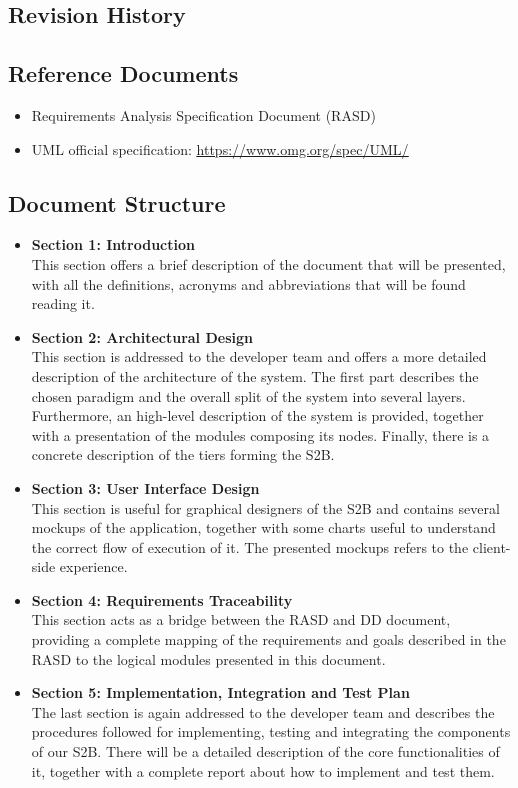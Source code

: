 \subsection{Revision History}
\subsection{Reference Documents}
\begin{itemize}
    \item Requirements Analysis Specification Document (RASD)
    \item UML official specification: \underline{\url{https://www.omg.org/spec/UML/}}
\end{itemize}
\subsection{Document Structure}
\begin{itemize}
    \item \textbf{Section 1: Introduction}\\This section offers a brief description of the document that will be presented, with all the definitions, acronyms and abbreviations that will be found reading it.
    \item \textbf{Section 2: Architectural Design}\\This section is addressed to the developer team and offers a more detailed description of the architecture of the system. The first part describes the chosen paradigm and the overall split of the system into several layers. Furthermore, an high-level description of the system is provided, together with a presentation of the modules composing its nodes. Finally, there is a concrete description of the tiers forming the S2B.
    \item \textbf{Section 3: User Interface Design}\\This section is useful for graphical designers of the S2B and contains several mockups of the application, together with some charts useful to understand the correct flow of execution of it. The presented mockups refers to the client-side experience.
    \item \textbf{Section 4: Requirements Traceability}\\This section acts as a bridge between the RASD and DD document, providing a complete mapping of the requirements and goals described in the RASD to the logical modules presented in this document.
    \item \textbf{Section 5: Implementation, Integration and Test Plan}\\The last section is again addressed to the developer team and describes the procedures followed for implementing, testing and integrating the components of our S2B. There will be a detailed description of the core functionalities of it, together with a complete report about how to implement and test them.
\end{itemize}

